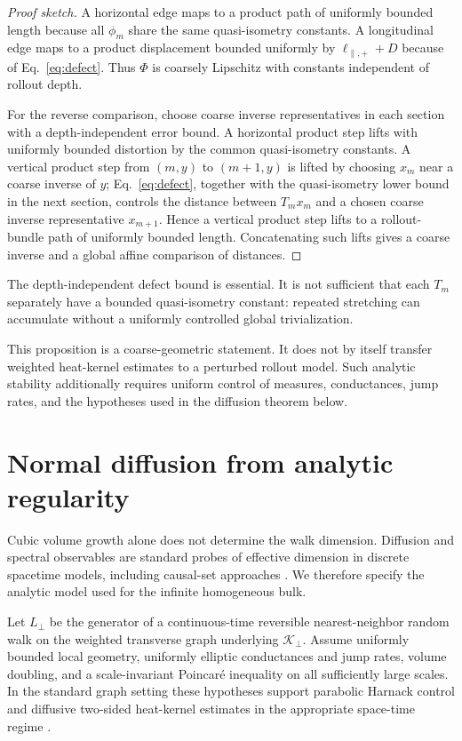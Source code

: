 \documentclass[11pt]{article}
\newcommand{\cK}{\mathcal{K}}
\begin{document}
\begin{proof}[Proof sketch]
A horizontal edge maps to a product path of uniformly bounded length because all \(\phi_m\) share the same quasi-isometry constants. A longitudinal edge maps to a product displacement bounded uniformly by \(\ell_{\parallel,+}+D\) because of Eq.~\eqref{eq:defect}. Thus \(\Phi\) is coarsely Lipschitz with constants independent of rollout depth.

For the reverse comparison, choose coarse inverse representatives in each section with a depth-independent error bound. A horizontal product step lifts with uniformly bounded distortion by the common quasi-isometry constants. A vertical product step from \((m,y)\) to \((m+1,y)\) is lifted by choosing \(x_m\) near a coarse inverse of \(y\); Eq.~\eqref{eq:defect}, together with the quasi-isometry lower bound in the next section, controls the distance between \(T_mx_m\) and a chosen coarse inverse representative \(x_{m+1}\). Hence a vertical product step lifts to a rollout-bundle path of uniformly bounded length. Concatenating such lifts gives a coarse inverse and a global affine comparison of distances.
\end{proof}

The depth-independent defect bound is essential. It is not sufficient that each \(T_m\) separately have a bounded quasi-isometry constant: repeated stretching can accumulate without a uniformly controlled global trivialization.

This proposition is a coarse-geometric statement. It does not by itself transfer weighted heat-kernel estimates to a perturbed rollout model. Such analytic stability additionally requires uniform control of measures, conductances, jump rates, and the hypotheses used in the diffusion theorem below.

\section{Normal diffusion from analytic regularity}

Cubic volume growth alone does not determine the walk dimension. Diffusion and spectral observables are standard probes of effective dimension in discrete spacetime models, including causal-set approaches \cite{EichhornMizera2014}. We therefore specify the analytic model used for the infinite homogeneous bulk.

Let \(L_\perp\) be the generator of a continuous-time reversible nearest-neighbor random walk on the weighted transverse graph underlying \(\cK_\perp\). Assume uniformly bounded local geometry, uniformly elliptic conductances and jump rates, volume doubling, and a scale-invariant Poincar\'e inequality on all sufficiently large scales. In the standard graph setting these hypotheses support parabolic Harnack control and diffusive two-sided heat-kernel estimates in the appropriate space-time regime \cite{Delmotte1999,Grigoryan2009}.
\end{document}
